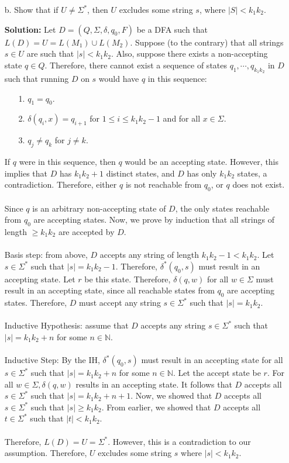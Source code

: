 \begin{enumerate}
\begin{enumerate}
\item[b.]Show that if $U \ne \Sigma^*$, then $U$ excludes some string $s$, where $|S| < k_1k_2$.

\textbf{Solution:} Let $D = (Q, \Sigma, \delta, q_0, F)$ be a DFA such that $L(D) = U = L(M_1) \cup L(M_2)$. Suppose (to the contrary) that all strings $s \in U$ are such that $|s| < k_1k_2$. Also, suppose there exists a non-accepting state $q \in Q$. Therefore, there cannot exist a sequence of states $q_1, \cdots, q_{k_1k_2}$ in $D$ such that running $D$ on $s$ would have $q$ in this sequence:
\begin{enumerate}
\item[1.]$q_1 = q_0$.
\item[2.]$\delta(q_i, x) = q_{i+1}$ for $1 \le i \le k_1k_2-1$ and for all $x \in \Sigma$.
\item[3.]$q_j \ne q_k$ for $j \ne k$.
\end{enumerate}
If $q$ were in this sequence, then $q$ would be an accepting state. However, this implies that $D$ has $k_1k_2+1$ distinct states, and $D$ has only $k_1k_2$ states, a contradiction. Therefore, either $q$ is not reachable from $q_0$, or $q$ does not exist. 
\\ \\
Since $q$ is an arbitrary non-accepting state of $D$, the only states reachable from $q_0$ are accepting states. Now, we prove by induction that all strings of length $\ge k_1k_2$ are accepted by $D$.
\\ \\
Basis step: from above, $D$ accepts any string of length $k_1k_2 - 1 < k_1k_2$. Let $s \in \Sigma^*$ such that $|s| = k_1k_2 - 1$. Therefore, $\delta^*(q_0, s)$ must result in an accepting state. Let $r$ be this state. Therefore, $\delta(q, w)$ for all $w \in \Sigma$ must result in an accepting state, since all reachable states from $q_0$ are accepting states. Therefore, $D$ must accept any string $s \in \Sigma^*$ such that $|s| = k_1k_2$. 
\\ \\
Inductive Hypothesis: assume that $D$ accepts any string $s \in \Sigma^*$ such that $|s| = k_1k_2 + n$ for some $n \in \mathbb{N}$. 
\\ \\
Inductive Step: By the IH, $\delta^*(q_0, s)$ must result in an accepting state for all $s \in \Sigma^*$ such that $|s| = k_1k_2 + n$ for some $n \in \mathbb{N}$. Let the accept state be $r$. For all $w \in \Sigma, \delta(q, w)$ results in an accepting state. It follows that $D$ accepts all $s \in \Sigma^*$ such that $|s| = k_1k_2+n+1$. Now, we showed that $D$ accepts all $s \in \Sigma^*$ such that $|s| \ge k_1k_2$. From earlier, we showed that $D$ accepts all $t \in \Sigma^*$ such that $|t| < k_1k_2$. 
\\ \\
Therefore, $L(D) = U = \Sigma^*$. However, this is a contradiction to our assumption. Therefore, $U$ excludes some string $s$ where $|s| < k_1k_2$. 

\end{enumerate}

\end{enumerate}